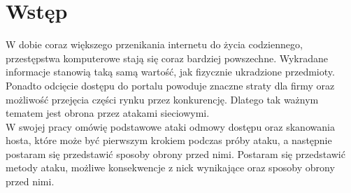 \chapter*{Wstęp}
	W dobie coraz większego przenikania internetu do życia codziennego, przestępstwa komputerowe stają się coraz bardziej powszechne.
	Wykradane informacje stanowią taką samą wartość, jak fizycznie ukradzione przedmioty.
	Ponadto odcięcie dostępu do portalu powoduje znaczne straty dla firmy oraz możliwość przejęcia części rynku przez konkurencję.
	Dlatego tak ważnym tematem jest obrona przez atakami sieciowymi.\\
	W swojej pracy omówię podstawowe ataki odmowy dostępu oraz skanowania hosta, które może być pierwszym krokiem podczas próby ataku, a następnie postaram się przedstawić sposoby obrony przed nimi.
	Postaram się przedstawić metody ataku, możliwe konsekwencje z nick wynikające oraz sposoby obrony przed nimi.
